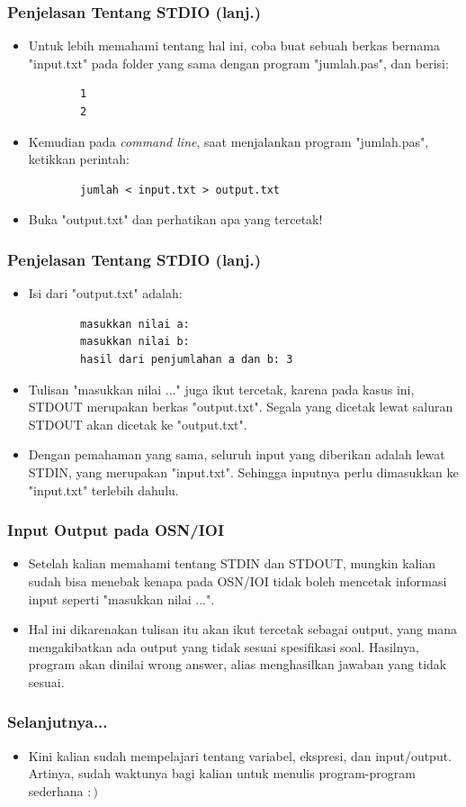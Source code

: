 \documentclass{beamer}
\begin{document}
\begin{frame}[fragile]
\frametitle{Penjelasan Tentang STDIO (lanj.)}
\begin{itemize}
	\item Untuk lebih memahami tentang hal ini, coba buat sebuah berkas bernama "input.txt" pada folder yang sama dengan program "jumlah.pas", dan berisi:
	\begin{lstlisting}
		1
		2
	\end{lstlisting}
	\item Kemudian pada \textit{command line}, saat menjalankan program "jumlah.pas", ketikkan perintah:
	\begin{lstlisting}
		jumlah < input.txt > output.txt
	\end{lstlisting}
	\item Buka "output.txt" dan perhatikan apa yang tercetak!
\end{itemize}
\end{frame}

\begin{frame}[fragile]
\frametitle{Penjelasan Tentang STDIO (lanj.)}
\begin{itemize}
	\item Isi dari "output.txt" adalah:
	\begin{lstlisting}
		masukkan nilai a: 
		masukkan nilai b: 
		hasil dari penjumlahan a dan b: 3
	\end{lstlisting}
	\item Tulisan "masukkan nilai ..." juga ikut tercetak, karena pada kasus ini, STDOUT merupakan berkas "output.txt". Segala yang dicetak lewat saluran STDOUT akan dicetak ke "output.txt".
	\item Dengan pemahaman yang sama, seluruh input yang diberikan adalah lewat STDIN, yang merupakan "input.txt". Sehingga inputnya perlu dimasukkan ke "input.txt" terlebih dahulu.
\end{itemize}
\end{frame}

\begin{frame}
\frametitle{Input Output pada OSN/IOI}
\begin{itemize}
	\item Setelah kalian memahami tentang STDIN dan STDOUT, mungkin kalian sudah bisa menebak kenapa pada OSN/IOI tidak boleh mencetak informasi input seperti "masukkan nilai ...".
	\item Hal ini dikarenakan tulisan itu akan ikut tercetak sebagai output, yang mana mengakibatkan ada output yang tidak sesuai spesifikasi soal. Hasilnya, program akan dinilai \alert{wrong answer}, alias menghasilkan jawaban yang tidak sesuai. 
\end{itemize}
\end{frame}

\begin{frame}
\frametitle{Selanjutnya...}
\begin{itemize}
	\item Kini kalian sudah mempelajari tentang variabel, ekspresi, dan input/output. Artinya, sudah waktunya bagi kalian untuk menulis program-program sederhana $:)$
\end{itemize}
\end{frame}
\end{document}
